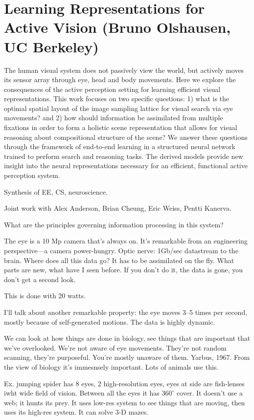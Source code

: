 \section{Learning Representations for Active Vision (Bruno Olshausen, UC Berkeley)}

The human visual system does not passively view the world, but actively moves its sensor array through eye, head and body movements.  Here we explore the consequences of the active perception setting for learning efficient visual representations.  This work focuses on two specific questions: 1) what is the optimal spatial layout of the image sampling lattice for visual search via eye movements?  and 2) how should information be assimilated from multiple fixations in order to form a holistic scene representation that allows for visual reasoning about compositional structure of the scene?   We answer these questions through the framework of end-to-end learning in a structured neural network trained to perform search and reasoning tasks.  The derived models provide new insight into the neural representations necessary for an efficient, functional active perception system.

Synthesis of EE, CS, neuroscience. 

Joint work with Alex Anderson, Brian Cheung, Eric Weiss, Pentti Kanerva. %

What are the principles governing information processing in this system?

The eye is a 10 Mp camera that's always on. It's remarkable from an engineering perspective---a camera power-hungry. Optic nerve: 1Gb/sec datastream to the brain. Where does all this data go? It has to be assimilated on the fly. What parts are new, what have I seen before. If you don't do it, the data is gone, you don't get a second look.

This is done with 20 watts.

I'll talk about another remarkable property: the eye moves 3--5 times per second, mostly because of self-generated motions. The data is highly dynamic.

We can look at how things are done in biology, see things that are important that we've overlooked. We're not aware of eye movements. They're not random scanning, they're purposeful. You're mostly unaware of them. Yarbus, 1967. From the view of biology it's immesnsely important. Lots of animals use this.

Ex. jumping spider has 8 eyes, 2 high-resolution eyes, eyes at side are fish-lenses iwht wide field of vision. Between all the eyes it has $360^{\circ}$ cover. It doesn't use a web; it hunts its prey. It uses low-res system to see things that are moving, then uses its high-res system. It can solve 3-D mazes.

